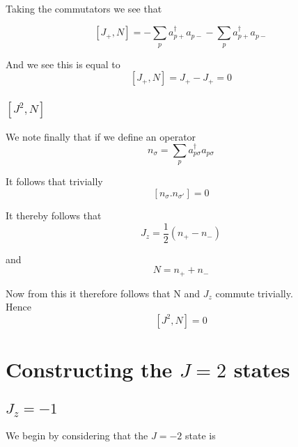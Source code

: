 \documentclass[11pt]{article} %
\begin{document}
Taking the commutators we see that\

\begin{equation}
\left[J_+,N\right]=-\sum_p a_{p+}^\dagger a_{p-} -\sum_p a_{p+}^\dagger a_{p-}
\end{equation}

And we see this is equal to\\
\begin{equation}
\left[J_+,N\right]=J_+ -J_+=0
\end{equation}

\subsubsection{$\left[J^2,N\right]$}

We note finally that if we define an operator 
\begin{equation}n_{\sigma}=\sum_p a_{p\sigma}^\dagger a_{p\sigma}\end{equation}

It follows that trivially \\

\begin{equation}
\left[n_{\sigma}.n_{\sigma'}\right]=0
\end{equation}

It thereby follows that \\

\begin{equation}
J_z=\frac{1}{2}\left(n_+ - n_-\right)
\end{equation}

and\\

\begin{equation}
N=n_++n_-
\end{equation}

Now from this it therefore follows that N and $J_z$ commute trivially.\\

Hence \\

\begin{equation}
\left[J^2,N\right]=0
\end{equation}

\section{Constructing the $J=2$ states}
\subsection{$J_z=-1$}
We begin by considering that the $J=-2$ state is\\
\end{document}
